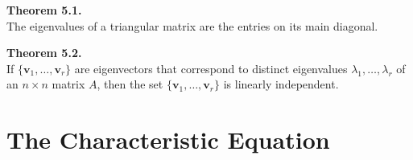 \documentclass[10pt]{book}
\newenvironment{boxthm}{\begin{mdframed}[backgroundcolor=gray!30,nobreak=true]}{\end{mdframed}}
\newcommand{\vect}[1]{\ensuremath{\boldsymbol{\mathbf{#1}}}}
\newcommand{\vectset}[3][v]{\{\vect{#1}_{#2},\ldots,\vect{#1}_{#3}\}}
\begin{document}
\begin{boxthm}
	\textbf{Theorem 5.1.} \\
	The eigenvalues of a triangular matrix are the entries on its main diagonal.
\end{boxthm}
\begin{boxthm}
	\textbf{Theorem 5.2.} \\
	If $\{\vect{v}_1,\ldots,\vect{v}_r\}$ are eigenvectors that correspond to distinct eigenvalues $\lambda_1,\ldots,\lambda_r$ of an $n\times n$ matrix $A$, then the set $\vectset[v]{1}{r}$ is linearly independent.
\end{boxthm}
\vfill


\section{The Characteristic Equation}
\end{document}
